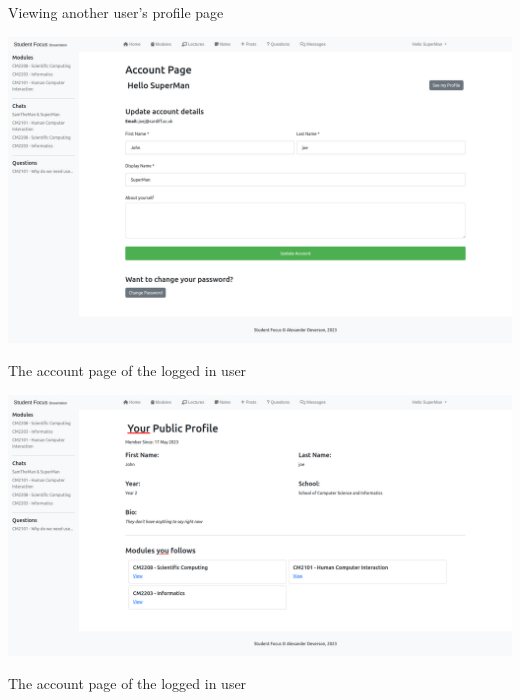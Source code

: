 Viewing another user's profile page

\includegraphics[scale=0.20]{images/application/28 - user_account_page.png}

The account page of the logged in user

\includegraphics[scale=0.20]{images/application/29 - users_profile.png}

The account page of the logged in user

